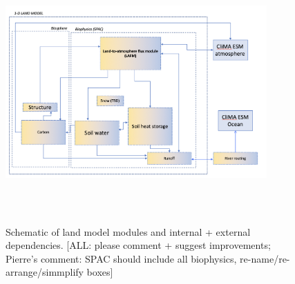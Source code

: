 \documentclass{article}
\begin{document}
\begin{figure}[]
\includegraphics[width=10cm,height=10cm,keepaspectratio]{CLIMA-land/LM_figures/JPLCLIMA_LM_DESIGN_20191115.png}
\caption{Schematic of land model modules and internal + external dependencies. [ALL: please comment + suggest improvements; Pierre's comment: SPAC should include all biophysics, re-name/re-arrange/simmplify boxes]}
\end{figure}
\end{document}
